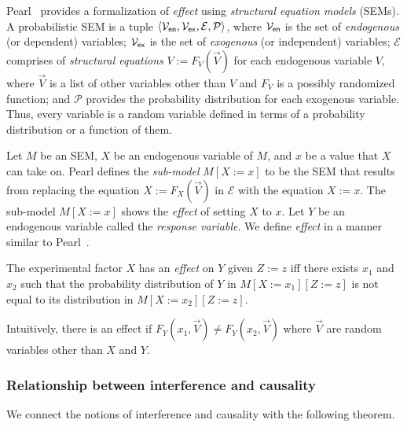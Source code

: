 \documentclass[10pt, onecolumn]{report}
\begin{document}
Pearl~\cite{pearl09book} provides a formalization of \emph{effect} using 
\emph{structural equation models} (SEMs). 
A probabilistic SEM is a tuple $\langle \mathcal{V}_{\mathsf{en}}, 
\mathcal{V}_{\mathsf{ex}}, \mathcal{E}, \mathcal{P}\rangle$, where 
$\mathcal{V}_{\mathsf{en}}$ is the set of \emph{endogenous} 
(or dependent) variables; $\mathcal{V}_{\mathsf{ex}}$ is the set of 
\emph{exogenous} (or independent) variables; $\mathcal{E}$ comprises of 
\emph{structural equations} $V := F_V(\vec{V})$ for each endogenous variable $V$, 
where $\vec{V}$ is a list of other variables other than $V$ and $F_V$ is a 
possibly randomized function; and $\mathcal{P}$ provides the probability distribution
for each exogenous variable.
Thus, every variable is a random variable defined in terms of a 
probability distribution or a function of them.

Let $M$ be an SEM, $X$ be an endogenous variable of $M$, and $x$ be a value that $X$ can take on. 
Pearl defines the \emph{sub-model} $M[X{:=}x]$ to be the SEM that results from replacing the equation $X := F_X(\vec{V})$ in $\mathcal{E}$ with the equation $X := x$.  
The sub-model $M[X{:=}x]$ shows the \emph{effect} of setting $X$ to $x$.
Let $Y$ be an endogenous variable called the \emph{response variable}.  We define \emph{effect} in a manner similar to Pearl~\cite{pearl09book}.
\begin{definition}[Effect]
\label{def:effect}
The experimental factor $X$ has an \emph{effect} on $Y$ given $Z:=z$ iff there exists $x_1$ and $x_2$ such that the probability distribution of $Y$ in $M[X{:=}x_1][Z{:=}z]$ is not equal to its distribution in $M[X{:=}x_2][Z{:=}z]$.
\end{definition}
Intuitively, there is an effect if $F_Y(x_1, \vec{V}) \neq F_Y(x_2, \vec{V})$ where $\vec{V}$ are random variables other than $X$ and $Y$.

\subsubsection{Relationship between interference and causality}

We connect the notions of interference and causality with the following theorem.
\end{document}
